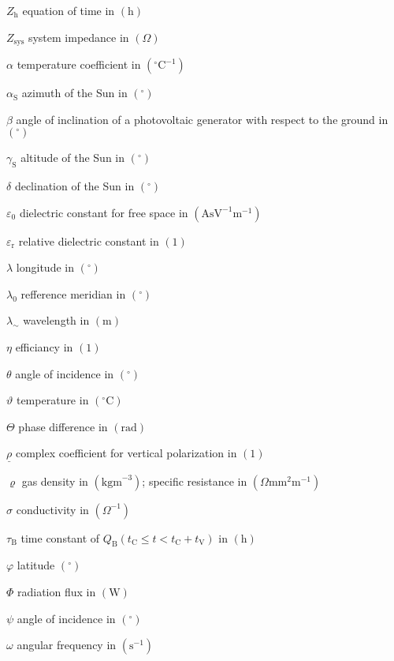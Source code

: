 \begin{symb}
\item[$Z_\mathrm{h}$]					equation of time in $\left(\mathrm{h}\right)$
\item[$Z_\mathrm{sys}$]					system impedance in $\left(\Omega\right)$
\item[$\alpha$]							temperature coefficient in $\left(^\circ \mathrm{C}^{-1}\right)$
\item[$\alpha_\mathrm{S}$]				azimuth of the Sun in $\left(^\circ\right)$
\item[$\beta$]							angle of inclination of a photovoltaic generator with respect to the ground in $\left(^\circ\right)$
\item[$\gamma_\mathrm{S}$]				altitude of the Sun in $\left(^\circ\right)$
\item[$\delta$]							declination of the Sun in $\left(^\circ\right)$
\item[$\varepsilon_\mathrm{0}$]			dielectric constant for free space in $\left(\mathrm{AsV}^{-1}\mathrm{m}^{-1}\right)$
\item[$\varepsilon_\mathrm{r}$]			relative dielectric constant in $\left(1\right)$
\item[$\lambda$]						longitude in $\left(^\circ\right)$
\item[$\lambda_0$]						refference meridian in $\left(^\circ\right)$
\item[$\lambda_\sim$]					wavelength in $\left(\mathrm{m}\right)$
\item[$\eta$]							efficiancy in $\left(1\right)$
\item[$\theta$]							angle of incidence in $\left(^\circ\right)$
\item[$\vartheta$]						temperature in $\left(^\circ \mathrm{C}\right)$
\item[$\Theta$]							phase difference in $\left(\mathrm{rad}\right)$
\item[$\underline{\rho}$]				complex coefficient for vertical polarization in $\left(1\right)$
\item[$\varrho$]						gas density in $\left(\mathrm{kgm}^{-3}\right)$; specific resistance in $\left(\Omega\mathrm{mm}^2\mathrm{m}^{-1}\right)$
\item[$\sigma$]							conductivity in $\left(\Omega^{-1}\right)$
\item[$\tau_\mathrm{B}$]				time constant of $Q_\mathrm{B}(t_\mathrm{C} \leq t < t_\mathrm{C} + t_\mathrm{V})$ in $\left(\mathrm{h}\right)$
\item[$\varphi$]						latitude $\left(^\circ\right)$
\item[$\Phi$]							radiation flux in $\left(\mathrm{W}\right)$
\item[$\psi$]							angle of incidence in $\left(^\circ\right)$
\item[$\omega$]							angular frequency in $\left(\mathrm{s}^{-1}\right)$
\end{symb}